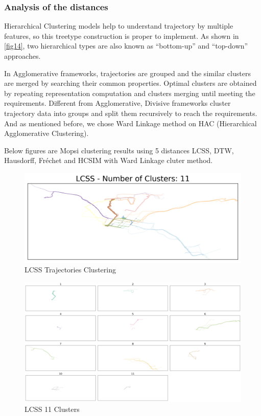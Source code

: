 \documentclass[a4paper, 12pt]{article}
\begin{document}
\subsubsection{Analysis of the distances}

Hierarchical Clustering models help to understand trajectory by multiple features, so this treetype construction is proper to implement. As shown in \autoref{fig14}, two hierarchical types are also known as “bottom-up” and “top-down” approaches.

In Agglomerative frameworks, trajectories are grouped and the similar clusters are merged by searching their common properties. Optimal clusters are obtained by repeating representation computation and clusters merging until meeting the requirements. Different from Agglomerative, Divisive frameworks cluster trajectory data into groups and split them recursively to reach the requirements. And as mentioned before, we chose Ward Linkage method on HAC (Hierarchical Agglomerative Clustering).

Below figures are Mopsi clustering results using 5 distances LCSS, DTW, Hausdorff, Fréchet and HCSIM with Ward Linkage cluter method.

\begin{figure}[htbp!]
    \centering
    \includegraphics[width=1\textwidth]{lcss_trajectory_clustering.png}
    \caption{LCSS Trajectories Clustering}
    \label{fig21}
\end{figure}

\begin{figure}[htbp!]
    \centering
    \includegraphics[width=1\textwidth]{lcss_11_clusters.png}
    \caption{LCSS 11 Clusters}
    \label{fig22}
\end{figure}
\end{document}
